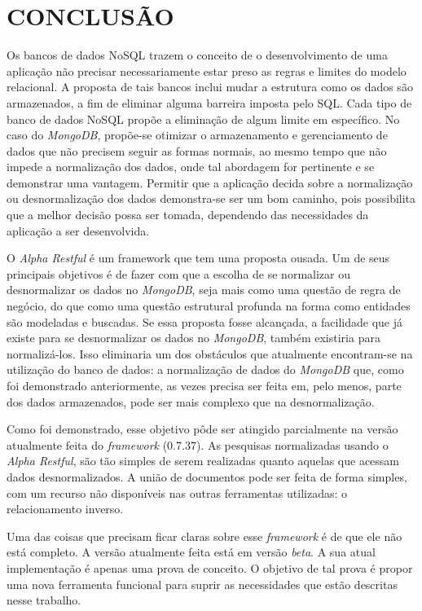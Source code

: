 \chapter{CONCLUSÃO}
\label{Conclusão}

Os bancos de dados NoSQL trazem o conceito de o desenvolvimento de uma aplicação não precisar necessariamente estar preso as regras e limites do modelo relacional. A proposta de tais bancos inclui mudar a estrutura como os dados são armazenados, a fim de eliminar alguma barreira imposta pelo SQL. Cada tipo de banco de dados NoSQL propõe a eliminação de algum limite em específico. No caso do \textit{MongoDB}, propõe-se otimizar o armazenamento e gerenciamento de dados que não precisem seguir as formas normais, ao mesmo tempo que não impede a normalização dos dados, onde tal abordagem for pertinente e se demonstrar uma vantagem. Permitir que a aplicação decida sobre a normalização ou desnormalização dos dados demonstra-se ser um bom caminho, pois possibilita que a melhor decisão possa ser tomada, dependendo das necessidades da aplicação a ser desenvolvida.

O \textit{Alpha Restful} é um framework que tem uma proposta ousada. Um de seus principais objetivos é de fazer com que a escolha de se normalizar ou desnormalizar os dados no \textit{MongoDB}, seja mais como uma questão de regra de negócio, do que como uma questão estrutural profunda na forma como entidades são modeladas e buscadas. Se essa proposta fosse alcançada, a facilidade que já existe para se desnormalizar os dados no \textit{MongoDB}, também existiria para normalizá-los. Isso eliminaria um dos obstáculos que atualmente encontram-se na utilização do banco de dados: a normalização de dados do \textit{MongoDB} que, como foi demonstrado anteriormente, as vezes precisa ser feita em, pelo menos, parte dos dados armazenados, pode ser mais complexo que na desnormalização.

Como foi demonstrado, esse objetivo pôde ser atingido parcialmente na versão atualmente feita do \textit{framework} (0.7.37). As pesquisas normalizadas usando o \textit{Alpha Restful}, são tão simples de serem realizadas quanto aquelas que acessam dados desnormalizados. A união de documentos pode ser feita de forma simples, com um recurso não disponíveis nas outras ferramentas utilizadas: o relacionamento inverso.

Uma das coisas que precisam ficar claras sobre esse \textit{framework} é de que ele não está completo. A versão atualmente feita está em versão \textit{beta}. A sua atual implementação é apenas uma prova de conceito. O objetivo de tal prova é propor uma nova ferramenta funcional para suprir as necessidades que estão descritas nesse trabalho.

